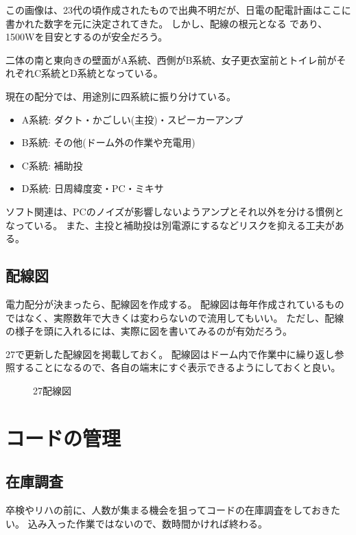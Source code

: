 \documentclass[letterpaper,10pt,dvipdfmx]{sphinxmanual}
\begin{document}
この画像は、23代の頃作成されたもので出典不明だが、日電の配電計画はここに書かれた数字を元に決定されてきた。
しかし、配線の根元となる 
であり、1500Wを目安とするのが安全だろう。

二体の南と東向きの壁面がA系統、西側がB系統、女子更衣室前とトイレ前がそれぞれC系統とD系統となっている。

現在の配分では、用途別に四系統に振り分けている。
\begin{itemize}
\item {} 
A系統: ダクト・かごしい(主投)・スピーカーアンプ

\item {} 
B系統: その他(ドーム外の作業や充電用)

\item {} 
C系統: 補助投

\item {} 
D系統: 日周緯度変・PC・ミキサ

\end{itemize}

ソフト関連は、PCのノイズが影響しないようアンプとそれ以外を分ける慣例となっている。
また、主投と補助投は別電源にするなどリスクを抑える工夫がある。


\subsection{配線図}
\label{\detokenize{haisen:id7}}
電力配分が決まったら、配線図を作成する。
配線図は毎年作成されているものではなく、実際数年で大きくは変わらないので流用してもいい。
ただし、配線の様子を頭に入れるには、実際に図を書いてみるのが有効だろう。

27で更新した配線図を掲載しておく。
配線図はドーム内で作業中に繰り返し参照することになるので、各自の端末にすぐ表示できるようにしておくと良い。
\begin{figure}[htbp]
\centering
\capstart

\noindent{}
\caption{27配線図}\label{\detokenize{haisen:id20}}\end{figure}


\section{コードの管理}
\label{\detokenize{haisen:id8}}

\subsection{在庫調査}
\label{\detokenize{haisen:id9}}
卒検やリハの前に、人数が集まる機会を狙ってコードの在庫調査をしておきたい。
込み入った作業ではないので、数時間かければ終わる。
\end{document}
